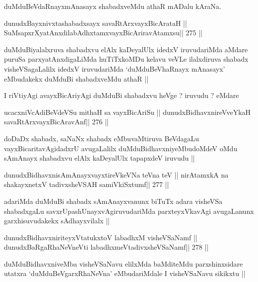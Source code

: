 \begin{artha}
duMduBeVdaRnayxmAnasayx shabadxveMdu athaR mADalu kAraNa.
\end{artha}

\begin{shl}
dunudxBayxnivxtashabadxsayx savaRtArxvayxBicArataH ||
SuMsapxrXyatAnxdilabAdhxtamxvayxBicAriravAtamxsu\hfill || 275 ||
\end{shl}

\begin{artha}
duMduBiyalalxruva shabadxvu elAlx kaDeyalUlx idedxV iruvudariMda aMdare puruSa parxyatAnxdigaLiMda huTiTxkoMDu kelavu veVLe ilalxdiruva shabadx visheVSagaLalilx idedxV iruvudariMda `duMduBeVhaRnayx mAnasayx' eMbudakekx duMduBi shabadxveMdu athaR ||
\end{artha}

\begin{artha}
I riVtiyAgi avayxBicAriyAgi duMduBi shabadxvu heVge ? iruvudu ? eMdare
\end{artha}

\begin{shl}
ucacxniVcAdiBeVdeVSu mithaH sa vayxBicAriSu ||
dunudxBidhavxnireVveYkaH savaRtArxvayxBicAravAnf\hfill || 276 ||
\end{shl}

\begin{artha}
doDaDx shabadx, saNaNx shabadx eMbuvaMtiruva BeVdagaLu vayxBicaritavAgidadxrU avugaLalilx duMduBidhavxniyeMbudoMdeV oMdu sAmAnayx shabadxvu elAlx kaDeyalUlx tapapxdeV iruvudu ||
\end{artha}

\begin{shl}
dunudxBidhavxnisAmAnayxvayxtireVkeVNa teVna teV ||
nirAtamxkA na shakayxnetxV tadivxsheVSAH samiVkiSxtumf\hfill || 277 ||
\end{shl}

\begin{artha}
adariMda duMduBi shabadx sAmAnayxvanunx biTuTx adara visheVSa shabadxgaLu savxrUpashUnayxvAgiruvudariMda parxteyxVkavAgi avugaLanunx garxhisuvudakekx sAdhayxvilalx ||
\end{artha}

\begin{shl}
dunudxBidhavxniriteyxVtatukxtoV labadhxM visheVSaNamf ||
dunudxBaRgaRhaNeVneVti labadhxmeVtadivxsheVSaNamf\hfill || 278 ||
\end{shl}

\begin{artha}
duMduBidhavxniveMba visheVSaNavu elilxMda baMditeMdu parxshinxsidare utatxra `duMduBeVgarxRhaNeVna' eMbudariMdale I visheVSaNavu sikikxtu ||
\end{artha}

